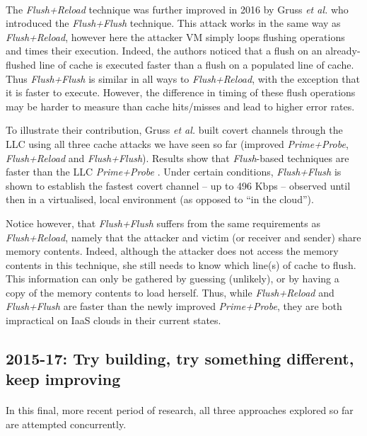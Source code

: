 \documentclass[orivec,envcountsame, a4paper, 11pt]{llncs}
\begin{document}
\paragraph{} The \textit{Flush+Reload} technique was further improved in 2016 by Gruss \textit{et al.} \cite{Gruss2016} who introduced the \textit{Flush+Flush} technique. This attack works in the same way as \textit{Flush+Reload}, however here the attacker VM simply loops flushing operations and times their execution. Indeed, the authors noticed that a flush on an already-flushed line of cache is executed faster than a flush on a populated line of cache. Thus \textit{Flush+Flush} is similar in all ways to \textit{Flush+Reload}, with the exception that it is faster to execute. However, the difference in timing of these flush operations may be harder to measure than cache hits/misses and lead to higher error rates.

To illustrate their contribution, Gruss \textit{et al.} \cite{Gruss2016} built covert channels through the LLC using all three cache attacks we have seen so far (improved \textit{Prime+Probe}, \textit{Flush+Reload} and \textit{Flush+Flush}). Results show that \textit{Flush}-based techniques are faster than the LLC \textit{Prime+Probe} \cite{Gruss2016}. Under certain conditions, \textit{Flush+Flush} is shown to establish the fastest covert channel -- up to 496 Kbps -- observed until then in a virtualised, local environment (as opposed to ``in the cloud'').

Notice however, that \textit{Flush+Flush} suffers from the same requirements as \textit{Flush+Reload}, namely that the attacker and victim (or receiver and sender) share memory contents. Indeed, although the attacker does not access the memory contents in this technique, she still needs to know which line(s) of cache to flush. This information can only be gathered by guessing (unlikely), or by having a copy of the memory contents to load herself. Thus, while \textit{Flush+Reload} and \textit{Flush+Flush} are faster than the newly improved \textit{Prime+Probe}, they are both impractical on IaaS clouds in their current states.



\subsection{2015-17: Try building, try something different, keep improving}
\label{sec:recent}

\paragraph{} In this final, more recent period of research, all three approaches explored so far are attempted concurrently.
\end{document}

